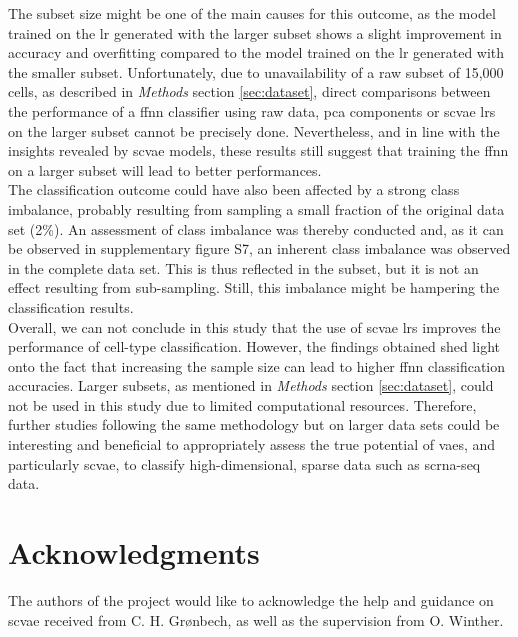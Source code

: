 \documentclass{article}
\begin{document}
\noindent The subset size might be one of the main causes for this outcome, as the model trained on the \gls{lr} generated with the larger subset shows a slight improvement in accuracy and overfitting compared to the model trained on the \gls{lr} generated with the smaller subset. 
Unfortunately, due to unavailability of a raw subset of 15,000 cells, as described in \textit{Methods} section \ref{sec:dataset}, direct comparisons between the performance of a \gls{ffnn} classifier using raw data, \gls{pca} components or \gls{scvae} \glspl{lr} on the larger subset cannot be precisely done.
Nevertheless, and in line with the insights revealed by \gls{scvae} models, these results still suggest that training the \gls{ffnn} on a larger subset will lead to better performances. \\

\noindent The classification outcome could have also been affected by a strong class imbalance, probably resulting from sampling a small fraction of the original data set (2\%).
An assessment of class imbalance was thereby conducted and, as it can be observed in supplementary figure S7,  an inherent class imbalance was observed in the complete data set.
This is thus reflected in the subset, but it is not an effect resulting from sub-sampling.
Still, this imbalance might be hampering the classification results. \\ 

\noindent Overall, we can not conclude in this study that the use of \gls{scvae} \glspl{lr} improves the performance of cell-type classification.
However, the findings obtained shed light onto the fact that increasing the sample size can lead to higher \gls{ffnn} classification accuracies. 
Larger subsets, as mentioned in \textit{Methods} section \ref{sec:dataset}, could not be used in this study due to limited computational resources.
Therefore, further studies following the same methodology but on larger data sets could be interesting and beneficial to appropriately assess the true potential of \glspl{vae}, and particularly \gls{scvae}, to classify high-dimensional, sparse data such as \gls{scrna-seq} data.
\\



\section{Acknowledgments}

\noindent The authors of the project would like to acknowledge the help and guidance on \gls{scvae} received from C. H. Grønbech, as well as the supervision from O. Winther.
\end{document}
